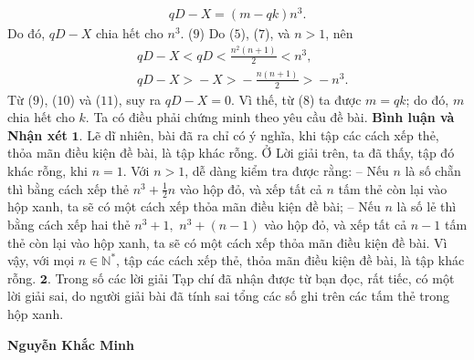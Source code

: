 \begin{multicols}{2}
\begin{align*}
		qD - X = \left( {m - qk} \right){n^3}. \tag{$8$}
	\end{align*}
	Do đó, $qD - X$ chia hết cho $n^3$. \hfill ($9$)
	\vskip 0.05cm
	Do ($5$), ($7$), và $n > 1$, nên
	\begin{align*}
		&qD \!-\! X \!<\! qD \!<\! \frac{{{n^2}\left( {n + 1} \right)}}{2} < {n^3}, \tag{$10$}\\
		&qD \!-\! X \!>\! -\! X \!>\! -\! \frac{{n\left( {n \!+\! 1} \right)}}{2} \!>\!  - {n^3}. \tag{$11$}
	\end{align*}
	Từ ($9$), ($10$) và ($11$), suy ra $qD - X = 0$. Vì thế, từ ($8$) ta được $m = qk$; do đó, $m$ chia hết cho $k$. Ta có điều phải chứng minh theo yêu cầu đề bài.
	\vskip 0.05cm
	\textbf{\color{thachthuctoanhoc}Bình luận và Nhận xét}
	\vskip 0.05cm
	$\pmb{1.}$ Lẽ dĩ nhiên, bài đã ra chỉ có ý nghĩa, khi tập các cách xếp thẻ, thỏa mãn điều kiện đề bài, là tập khác rỗng.
	\vskip 0.05cm
	Ở Lời giải trên, ta đã thấy, tập đó khác rỗng, khi $n = 1$.
	\vskip 0.05cm
	Với $n > 1$, dễ dàng kiểm tra được rằng:
	\vskip 0.05cm
	-- Nếu $n$ là số chẵn thì bằng cách xếp thẻ  ${n^3} + \frac{1}{2}n$ vào hộp đỏ, và xếp tất cả $n$ tấm thẻ còn lại vào hộp xanh, ta sẽ có một cách xếp thỏa mãn điều kiện đề bài;
	\vskip 0.05cm
	-- Nếu $n$ là số lẻ thì bằng cách xếp hai thẻ ${n^3} + 1,$ ${n^3} + \left( {n - 1} \right)$   vào hộp đỏ, và xếp tất cả $n - 1$ tấm thẻ còn lại vào hộp xanh, ta sẽ có một cách xếp thỏa mãn điều kiện đề bài.
	\vskip 0.05cm
	Vì vậy, với mọi $n \in \mathbb{N^*}$, tập các cách xếp thẻ, thỏa mãn điều kiện đề bài, là tập khác rỗng.
	\vskip 0.05cm
	$\pmb{2.}$ Trong số các lời giải Tạp chí đã nhận được từ bạn đọc, rất tiếc, có một lời giải sai, do người giải bài đã tính sai tổng các số ghi trên các tấm thẻ trong hộp xanh.
	\begin{flushright}
			\textbf{\color{thachthuctoanhoc}Nguyễn Khắc Minh}
	\end{flushright}
\end{multicols}